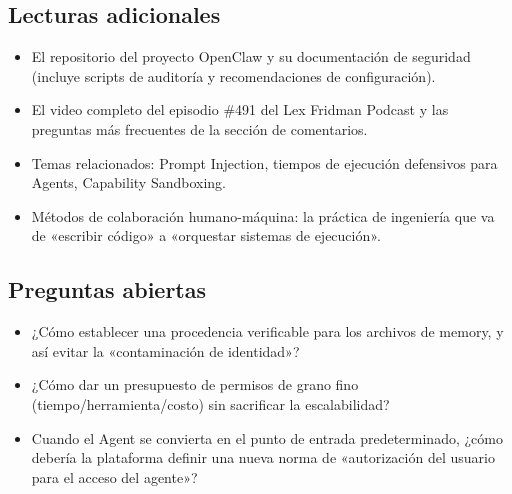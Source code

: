 \subsection{Lecturas adicionales}
\begin{itemize}
    \item El repositorio del proyecto OpenClaw y su documentación de seguridad (incluye scripts de auditoría y recomendaciones de configuración).
    \item El video completo del episodio \#491 del Lex Fridman Podcast y las preguntas más frecuentes de la sección de comentarios.
    \item Temas relacionados: Prompt Injection, tiempos de ejecución defensivos para Agents, Capability Sandboxing.
    \item Métodos de colaboración humano-máquina: la práctica de ingeniería que va de «escribir código» a «orquestar sistemas de ejecución».
\end{itemize}

\subsection{Preguntas abiertas}
\begin{itemize}
    \item ¿Cómo establecer una procedencia verificable para los archivos de memory, y así evitar la «contaminación de identidad»?
    \item ¿Cómo dar un presupuesto de permisos de grano fino (tiempo/herramienta/costo) sin sacrificar la escalabilidad?
    \item Cuando el Agent se convierta en el punto de entrada predeterminado, ¿cómo debería la plataforma definir una nueva norma de «autorización del usuario para el acceso del agente»?
\end{itemize}


